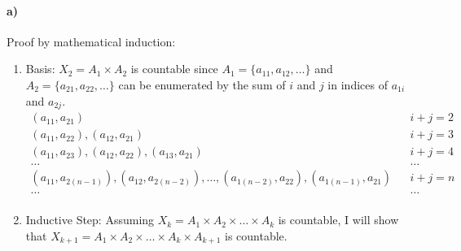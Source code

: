\documentclass[12pt]{article}
\newcommand\+{\mkern2mu}
\begin{document}
\paragraph{a)}
Proof by mathematical induction:
\begin{enumerate}
\item Basis: $X_2 = A_1 \times A_2$ is countable since $A_1 = \{a_{11}, a_{12}, \dotsc \}$ and $A_2 = \{a_{21}, a_{22}, \dotsc \}$ can be enumerated by the sum of $i$ and $j$ in indices of $a_{1i}$ and $a_{2j}$.
\begin{align*}
(a_{11}, a_{21}) && i + j = 2 \\
(a_{11}, a_{22}), (a_{12}, a_{21}) && i + j = 3 \\
(a_{11}, a_{23}), (a_{12}, a_{22}), (a_{13}, a_{21}) && i + j = 4 \\
\dotsc && \dotsc \\
(a_{11}, a_{2(n-1)}), (a_{12}, a_{2(n-2)}), \dotsc, (a_{1(n-2)}, a_{22}), (a_{1(n-1)}, a_{21}) && i + j = n\\
\dotsc && \dotsc \\
\end{align*}
\item Inductive Step: Assuming $X_k = A_1 \times A_2 \times \dotsc \times A_k$ is countable, I will show that $X_{k+1} = A_1 \times A_2 \times \dotsc \times A_k \times A_{k+1}$ is countable.
\end{enumerate}
\end{document}
